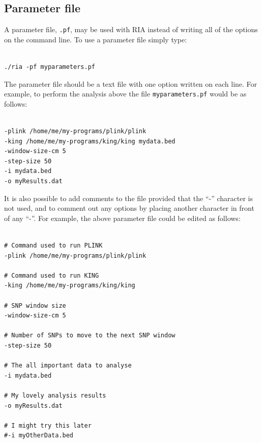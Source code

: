 \documentclass[a4paper,12pt]{article}
\newcommand{\code}[1]{{\footnotesize{{\tt #1}}}}
\begin{document}
\subsection{Parameter file}
\label{parameterfile}

A parameter file, \code{.pf}, may be used with RIA instead of writing all of the options on the command line. To use a parameter file simply type: 
\vspace{0.35cm} \begin{lstlisting}

./ria -pf myparameters.pf

\end{lstlisting} \vspace{0.35cm}
The parameter file should be a text file with one option written on each line. For example, to perform the analysis above the file \code{myparameters.pf} would be as follows: 
\vspace{0.35cm} \begin{lstlisting}

-plink /home/me/my-programs/plink/plink
-king /home/me/my-programs/king/king mydata.bed
-window-size-cm 5
-step-size 50
-i mydata.bed
-o myResults.dat

\end{lstlisting} \vspace{0.35cm}
It is also possible to add comments to the file provided that the ``-'' character is not used, and to comment out any options by placing another character in front of any ``-''. For example, the above parameter file could be edited as follows: 
\vspace{0.35cm} \begin{lstlisting}

# Command used to run PLINK
-plink /home/me/my-programs/plink/plink

# Command used to run KING
-king /home/me/my-programs/king/king

# SNP window size
-window-size-cm 5

# Number of SNPs to move to the next SNP window
-step-size 50

# The all important data to analyse
-i mydata.bed

# My lovely analysis results
-o myResults.dat

# I might try this later
#-i myOtherData.bed

\end{lstlisting} \vspace{0.35cm}
\end{document}
